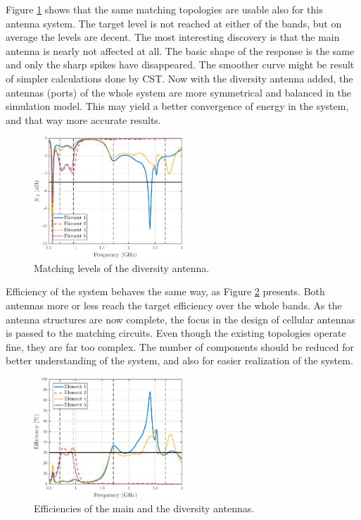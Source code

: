 Figure \ref{fig:div_match_orig} shows that the same matching topologies are usable also for this antenna system. The target level is not reached at either of the bands, but on average the levels are decent. The most interesting discovery is that the main antenna is nearly not affected at all. The basic shape of the response is the same and only the sharp spikes have disappeared. The smoother curve might be result of simpler calculations done by CST. Now with the diversity antenna added, the antennas (ports) of the whole system are more symmetrical and balanced in the simulation model. This may yield a better convergence of energy in the system, and that way more accurate results. 
\begin{figure}[H]
    \centering
    \includegraphics[width=0.5\textwidth]{img/diversity_match_orig.eps}
    \caption{Matching levels of the diversity antenna.}
    \label{fig:div_match_orig}
\end{figure}

Efficiency of the system behaves the same way, as Figure \ref{fig:div_eff_orig} presents. Both antennas more or less reach the target efficiency over the whole bands. As the antenna structures are now complete, the focus in the design of cellular antennas is passed to the matching circuits. Even though the existing topologies operate fine, they are far too complex. The number of components should be reduced for better understanding of the system, and also for easier realization of the system.
\begin{figure}[H]
    \centering
    \includegraphics[width=0.5\textwidth]{img/diversity_eff_ideal_orig.eps}
    \caption{Efficiencies of the main and the diversity antennas.}
    \label{fig:div_eff_orig}
\end{figure}

